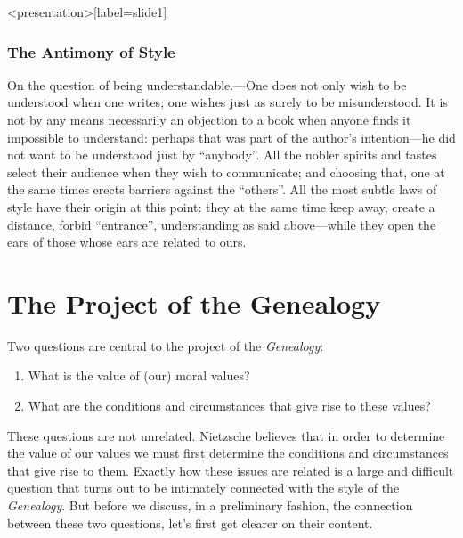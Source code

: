 \begin{frame}<presentation>[label=slide1]
    \frametitle{The Antimony of Style}
        \alert{On the question of being understandable.}---One does not only wish to be understood when one writes; one wishes just as surely to be misunderstood. It is not by any means necessarily an objection to a book when anyone finds it impossible to understand: perhaps that was part of the author's intention---he did not want to be understood just by ``anybody''. All the nobler spirits and tastes select their audience when they wish to communicate; and choosing that, one at the same times erects barriers against the ``others''. All the most subtle laws of style have their origin at this point: they at the same time keep away, create a distance, forbid ``entrance'', understanding as said above---while they open the ears of those whose ears are related to ours.
\end{frame}


\section{The Project of the Genealogy}\label{sec:the_project_of_the_genealogy} %

Two questions are central to the project of the \emph{Genealogy}:
\begin{enumerate}
    \item What is the value of (our) moral values?
    \item What are the conditions and circumstances that give rise to these values?
\end{enumerate}
These questions are not unrelated. Nietzsche believes that in order to determine the value of our values we must first determine the conditions and circumstances that give rise to them. Exactly how these issues are related is a large and difficult question that turns out to be intimately connected with the style of the \emph{Genealogy}. But before we discuss, in a preliminary fashion, the connection between these two questions, let's first get clearer on their content.

